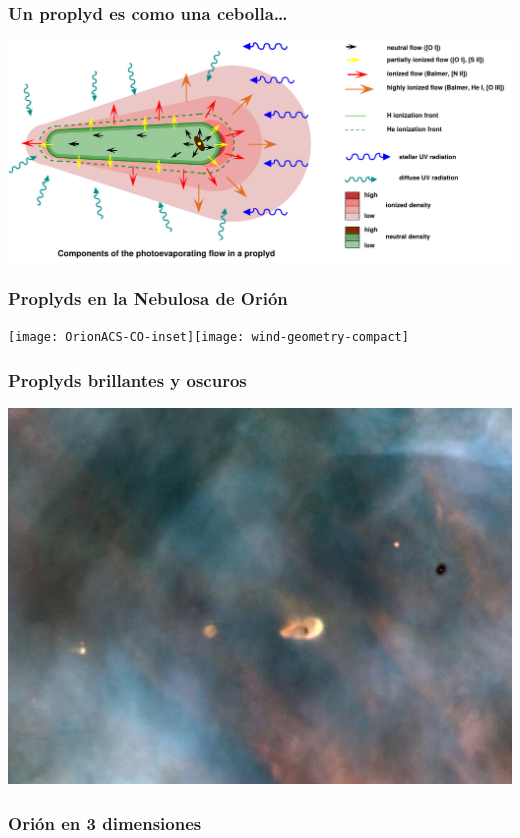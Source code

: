 \documentclass{beamer}
\begin{document}
\begin{frame} \frametitle{Un proplyd es como una cebolla\dots}
  \colorbox{white}{\includegraphics{modcart_col}}
\end{frame}

\begin{frame}
  \frametitle{Proplyds en la Nebulosa de Orión}
  \texttt{[image: OrionACS-CO-inset]}\texttt{[image: wind-geometry-compact]}
\end{frame}

\begin{frame}
  \frametitle{Proplyds brillantes y oscuros}
  \includegraphics{HST10}
\end{frame}

\begin{frame}
  \frametitle{Orión en 3 dimensiones}
\end{frame}
\end{document}
